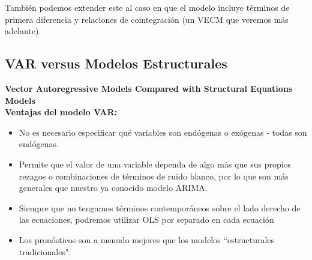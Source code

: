 		Tambi\'en podemos extender este al caso en que el modelo incluye t\'erminos de primera diferencia y relaciones de cointegraci\'on (un VECM que veremos m\'as adelante).
		
\subsection{VAR versus Modelos Estructurales}
		
		\textbf{Vector Autoregressive Models Compared with Structural Equations Models}\\
		
		\textbf{Ventajas del modelo VAR:}
			\begin{itemize}
				\item No es necesario especificar qu\'e variables son end\'ogenas o ex\'ogenas - todas son end\'ogenas.
				\item Permite que el valor de una variable dependa de algo m\'as que sus propios rezagos o combinaciones de t\'erminos de ruido blanco, por lo que son m\'as generales que nuestro ya conocido modelo ARIMA.
				\item Siempre que no tengamos t\'erminos contempor\'aneos sobre el lado derecho de las ecuaciones, podremos utilizar OLS por separado en cada ecuaci\'on 
				\item Los pron\'osticos son a menudo mejores que los modelos ``estructurales tradicionales".
			\end{itemize}
		
		
		
